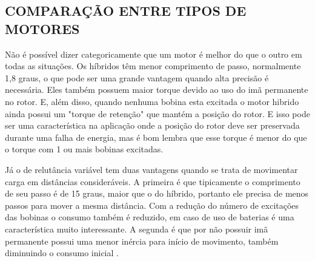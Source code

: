 \subsection{COMPARAÇÃO ENTRE TIPOS DE MOTORES}
Não é possível dizer categoricamente que um motor é melhor do que o outro em todas as situações. Os híbridos têm menor comprimento de passo, normalmente 1,8 graus, o que pode ser uma grande vantagem quando alta precisão é necessária. Eles também possuem maior torque devido ao uso do imã permanente no rotor. E, além disso, quando nenhuma bobina esta excitada o motor hibrido ainda possui um "torque de retenção" que mantém a posição do rotor. E isso pode ser uma característica na aplicação onde a posição do rotor deve ser preservada durante uma falha de energia, mas é bom lembra que esse torque é menor do que o torque com 1 ou mais bobinas excitadas.

Já o de relutância variável tem duas vantagens quando se trata de movimentar carga em distâncias consideráveis. A primeira é que tipicamente o comprimento de seu passo é de 15 graus, maior que o do híbrido, portanto ele precisa de menos passos para mover a mesma distância. Com a redução do número de excitações das bobinas o consumo também é reduzido, em caso de uso de baterias é uma característica muito interessante. A segunda é que por não possuir imã permanente possui uma menor inércia para início de movimento, também diminuindo o consumo inicial \cite{acarnley2002stepping}.
